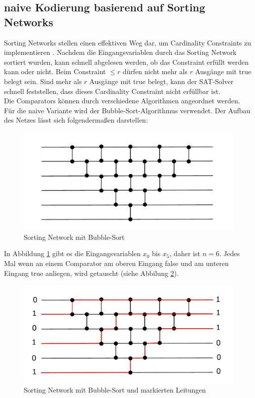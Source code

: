 \documentclass[a4,abstract=on]{scrartcl}
\begin{document}
	\subsection{naive Kodierung basierend auf Sorting Networks}
Sorting Networks stellen einen effektiven Weg dar, um Cardinality Constraints zu implementieren \cite[vgl.][]{niklasse}. Nachdem die Eingangsvariablen durch das Sorting Network sortiert wurden, kann schnell abgelesen werden, ob das Constraint erfüllt werden kann oder nicht.
Beim Constraint $\leq r$ dürfen nicht mehr als $r$ Ausgänge mit true belegt sein. Sind mehr als $r$ Ausgänge mit true belegt, kann der SAT-Solver schnell feststellen, dass dieses Cardinality Constraint nicht erfüllbar ist.\\
Die Comparators können durch verschiedene Algorithmen angeordnet werden. Für die naive Variante wird der Bubble-Sort-Algorithmus verwendet. Der Aufbau des Netzes lässt sich folgendermaßen darstellen:\\

\begin{figure}[H]
\centering
\includegraphics[width=\textwidth]{sorting_network_bubble.pdf}
\caption{Sorting Network mit Bubble-Sort}
\label{fig:sorting_network_naiv_bsp}
\end{figure}

In Abbildung \ref{fig:sorting_network_naiv_bsp} gibt es die Eingangsvariablen $x_0$ bis $x_5$, daher ist $n=6$. Jedes Mal wenn an einem Comparator am oberen Eingang false und am unteren Eingang true anliegen, wird getauscht (siehe Abbilung \ref{fig:sorting_network_naiv_bsp1}).

\begin{figure}[H]
\centering
\includegraphics[width=\textwidth]{sorting_network_bubble_rot.pdf}
\caption{Sorting Network mit Bubble-Sort und markierten Leitungen}
\label{fig:sorting_network_naiv_bsp1}
\end{figure}
\end{document}
